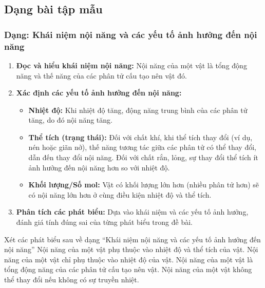 

\subsection{Dạng bài tập mẫu}

\subsubsection{Dạng: Khái niệm nội năng và các yếu tố ảnh hưởng đến nội năng}
\begin{phuongphap}
\begin{enumerate}
    \item \textbf{Đọc và hiểu khái niệm nội năng:} Nội năng của một vật là tổng động năng và thế năng của các phân tử cấu tạo nên vật đó.
    \item \textbf{Xác định các yếu tố ảnh hưởng đến nội năng:}
    \begin{itemize}
        \item \textbf{Nhiệt độ:} Khi nhiệt độ tăng, động năng trung bình của các phân tử tăng, do đó nội năng tăng.
        \item \textbf{Thể tích (trạng thái):} Đối với chất khí, khi thể tích thay đổi (ví dụ, nén hoặc giãn nở), thế năng tương tác giữa các phân tử có thể thay đổi, dẫn đến thay đổi nội năng. Đối với chất rắn, lỏng, sự thay đổi thể tích ít ảnh hưởng đến nội năng hơn so với nhiệt độ.
        \item \textbf{Khối lượng/Số mol:} Vật có khối lượng lớn hơn (nhiều phân tử hơn) sẽ có nội năng lớn hơn ở cùng điều kiện nhiệt độ và thể tích.
    \end{itemize}
    \item \textbf{Phân tích các phát biểu:} Dựa vào khái niệm và các yếu tố ảnh hưởng, đánh giá tính đúng sai của từng phát biểu trong đề bài.
\end{enumerate}
\end{phuongphap}
\begin{vidumau}
Xét các phát biểu sau về dạng “Khái niệm nội năng và các yếu tố ảnh hưởng đến nội năng”
\choice
{\True Nội năng của một vật phụ thuộc vào nhiệt độ và thể tích của vật.}
{Nội năng của một vật chỉ phụ thuộc vào nhiệt độ của vật.}
{Nội năng của một vật là tổng động năng của các phân tử cấu tạo nên vật.}
{Nội năng của một vật không thể thay đổi nếu không có sự truyền nhiệt.}
\end{vidumau}

